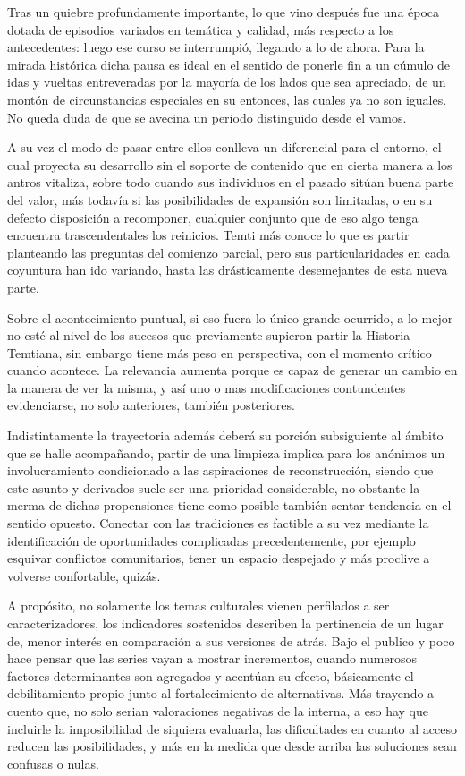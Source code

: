 \documentclass[
]{book}
\begin{document}
Tras un quiebre profundamente importante, lo que vino después fue una época dotada de episodios variados en temática y calidad, más respecto a los antecedentes: luego ese curso se interrumpió, llegando a lo de ahora. Para la mirada histórica dicha pausa es ideal en el sentido de ponerle fin a un cúmulo de idas y vueltas entreveradas por la mayoría de los lados que sea apreciado, de un montón de circunstancias especiales en su entonces, las cuales ya no son iguales. No queda duda de que se avecina un periodo distinguido desde el vamos.

A su vez el modo de pasar entre ellos conlleva un diferencial para el entorno, el cual proyecta su desarrollo sin el soporte de contenido que en cierta manera a los antros vitaliza, sobre todo cuando sus individuos en el pasado sitúan buena parte del valor, más todavía si las posibilidades de expansión son limitadas, o en su defecto disposición a recomponer, cualquier conjunto que de eso algo tenga encuentra trascendentales los reinicios. Temti más conoce lo que es partir planteando las preguntas del comienzo parcial, pero sus particularidades en cada coyuntura han ido variando, hasta las drásticamente desemejantes de esta nueva parte.

Sobre el acontecimiento puntual, si eso fuera lo único grande ocurrido, a lo mejor no esté al nivel de los sucesos que previamente supieron partir la Historia Temtiana, sin embargo tiene más peso en perspectiva, con el momento crítico cuando acontece. La relevancia aumenta porque es capaz de generar un cambio en la manera de ver la misma, y así uno o mas modificaciones contundentes evidenciarse, no solo anteriores, también posteriores.

Indistintamente la trayectoria además deberá su porción subsiguiente al ámbito que se halle acompañando, partir de una limpieza implica para los anónimos un involucramiento condicionado a las aspiraciones de reconstrucción, siendo que este asunto y derivados suele ser una prioridad considerable, no obstante la merma de dichas propensiones tiene como posible también sentar tendencia en el sentido opuesto. Conectar con las tradiciones es factible a su vez mediante la identificación de oportunidades complicadas precedentemente, por ejemplo esquivar conflictos comunitarios, tener un espacio despejado y más proclive a volverse confortable, quizás.

A propósito, no solamente los temas culturales vienen perfilados a ser caracterizadores, los indicadores sostenidos describen la pertinencia de un lugar de, menor interés en comparación a sus versiones de atrás. Bajo el publico y poco hace pensar que las series vayan a mostrar incrementos, cuando numerosos factores determinantes son agregados y acentúan su efecto, básicamente el debilitamiento propio junto al fortalecimiento de alternativas. Más trayendo a cuento que, no solo serian valoraciones negativas de la interna, a eso hay que incluirle la imposibilidad de siquiera evaluarla, las dificultades en cuanto al acceso reducen las posibilidades, y más en la medida que desde arriba las soluciones sean confusas o nulas.
\end{document}
